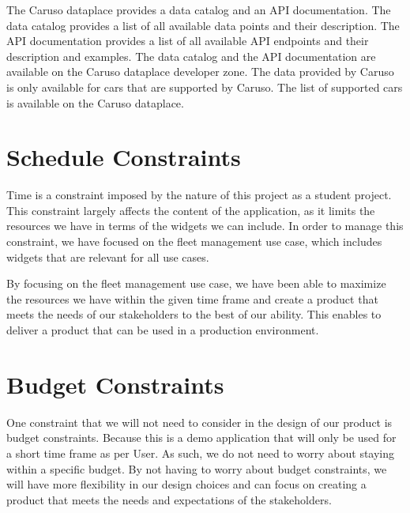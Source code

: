 The Caruso dataplace provides a data catalog and an API documentation. The data catalog provides a list of all available data points and their description. The API documentation provides a list of all available API endpoints and their description and examples. The data catalog and the API documentation are available on the Caruso dataplace developer zone. The data provided by Caruso is only available for cars that are supported by Caruso. The list of supported cars is available on the Caruso dataplace.

\section{Schedule Constraints}

Time is a constraint imposed by the nature of this project as a student project. This constraint largely affects the content of the application, as it limits the resources we have in terms of the widgets we can include. In order to manage this constraint, we have focused on the fleet management use case, which includes widgets that are relevant for all use cases.

By focusing on the fleet management use case, we have been able to maximize the resources we have within the given time frame and create a product that meets the needs of our stakeholders to the best of our ability. This enables to deliver a product that can be used in a production environment.



\section{Budget Constraints}

One constraint that we will not need to consider in the design of our product is budget constraints. Because this is a demo application that will only be used for a short time frame as per User. As such, we do not need to worry about staying within a specific budget. By not having to worry about budget constraints, we will have more flexibility in our design choices and can focus on creating a product that meets the needs and expectations of the stakeholders.